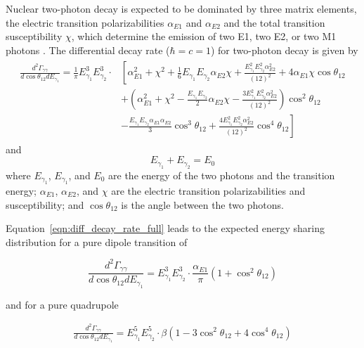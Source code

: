 \documentclass[cnatzke_thesis_proposal.tex]{subfiles}
\begin{document}
Nuclear two-photon decay is expected to be dominated by three matrix elements, the electric transition polarizabilities $\alpha_{E1}$ and $\alpha_{E2}$ and the total transition susceptibility $\chi$, which determine the emission of two E1, two E2, or two M1 photons \cite{kramp_nuclear_1987}.
The differential decay rate ($\hbar = c = 1$) for two-photon decay is given by 
\begin{align} \label{eqn:diff_decay_rate_full}
    \begin{split}
    \frac{d^2\Gamma_{\gamma\gamma}}{d \cos\theta_{12} dE_{\gamma_1}} = \frac{1}{\pi} E_{\gamma_1}^3 E_{\gamma_2}^3 \cdot & \left[ \alpha^2_{E1} + \chi^2 + \frac{1}{6} E_{\gamma_1} E_{\gamma_2} \alpha_{E2} \chi + \frac{E_{\gamma_1}^2 E_{\gamma_2}^2 \alpha_{E2}^2}{(12)^2} + 4 \alpha_{E1} \chi \cos\theta_{12} \right. \\ 
    &\left. + \left(\alpha_{E1}^2 + \chi^2 - \frac{E_{\gamma_1} E_{\gamma_2}}{2} \alpha_{E2} \chi - \frac{3 E_{\gamma_1}^2 E_{\gamma_2}^2 \alpha_{E2}^2}{(12)^2}\right) \cos^2\theta_{12} \right. \\
    &\left. - \frac{E_{\gamma_1} E_{\gamma_2} \alpha_{E1} \alpha_{E2}}{3} \cos^3\theta_{12} + \frac{4 E_{\gamma_1}^2 E_{\gamma_2}^2 \alpha_{E2}^2}{(12)^2} \cos^4\theta_{12} \right]
    \end{split}
\end{align}
and     
\begin{equation} \label{eqn:two_photon_energy_sum}
    E_{\gamma_1} + E_{\gamma_2} = E_0
\end{equation}
where $E_{\gamma_1}$, $E_{\gamma_1}$, and $E_{0}$ are the energy of the two photons and the transition energy; $\alpha_{E1}$, $\alpha_{E2}$, and $\chi$ are the electric transition polarizabilities and susceptibility; and $\cos\theta_{12}$ is the angle between the two photons. 

Equation~\ref{eqn:diff_decay_rate_full} leads to the expected energy sharing distribution for a pure dipole transition of 

\begin{equation}
    \frac{d^2\Gamma_{\gamma\gamma}}{d \cos\theta_{12} dE_{\gamma_1}} =  E_{\gamma_1}^3 E_{\gamma_2}^3 \cdot \frac{\alpha_{E1}}{\pi} \left( 1 + \cos^2\theta_{12} \right)
\end{equation}

and for a pure quadrupole

\begin{align}
    \frac{d^2\Gamma_{\gamma\gamma}}{d \cos\theta_{12} dE_{\gamma_1}} = E_{\gamma_1}^5 E_{\gamma_2}^5 \cdot \beta \left( 1 - 3 \cos^2\theta_{12} + 4 \cos^4 \theta_{12} \right) 
\end{align}
\end{document}

